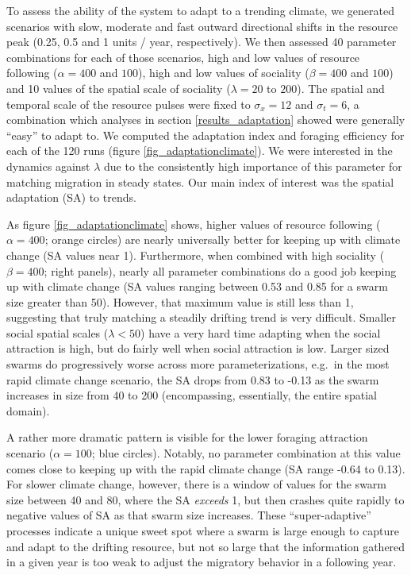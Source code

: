 \documentclass[utf8]{frontiersSCNS} %
\begin{document}
	To assess the ability of the system to adapt to a trending climate, we generated scenarios with slow, moderate and fast outward directional shifts in the resource peak (0.25, 0.5 and 1 units / year, respectively). We then assessed 40 parameter combinations for each of those scenarios, high and low values of resource following ($\alpha = 400$ and $100$), high and low values of sociality ($\beta = 400$ and $100$) and 10 values of the spatial scale of sociality ($\lambda = 20$ to $200$). The spatial and temporal scale of the resource pulses were fixed to $\sigma_x = 12$ and $\sigma_t = 6$, a combination which analyses in section \ref{results_adaptation} showed were generally ``easy'' to adapt to. We computed the adaptation index and foraging efficiency for each of the 120 runs (figure \ref{fig_adaptationclimate}). We were interested in the dynamics against $\lambda$ due to the consistently high importance of this parameter for matching migration in steady states. Our main index of interest was the spatial adaptation (SA) to trends. 
	
	As figure \ref{fig_adaptationclimate} shows, higher values of resource following ($\alpha = 400$; orange circles) are nearly universally better for keeping up with climate change (SA values near 1). Furthermore, when combined with high sociality ($\beta = 400$; right panels), nearly all parameter combinations do a good job keeping up with climate change (SA values ranging between 0.53 and 0.85 for a swarm size greater than 50). However, that maximum value is still less than 1, suggesting that truly matching a steadily drifting trend is very difficult. Smaller social spatial scales ($\lambda < 50$) have a very hard time adapting when the social attraction is high, but do fairly well when social attraction is low. Larger sized swarms do progressively worse across more parameterizations, e.g.~in the most rapid climate change scenario, the SA drops from 0.83 to -0.13 as the swarm increases in size from 40 to 200 (encompassing, essentially, the entire spatial domain).
	
	A rather more dramatic pattern is visible for the lower foraging attraction scenario ($\alpha = 100$; blue circles). Notably, no parameter combination at this value comes close to keeping up with the rapid climate change (SA range -0.64 to 0.13). For slower climate change, however, there is a window of values for the swarm size between 40 and 80, where the SA \emph{exceeds} 1, but then crashes quite rapidly to negative values of SA as that swarm size increases. These ``super-adaptive'' processes indicate a unique sweet spot where a swarm is large enough to capture and adapt to the drifting resource, but not so large that the information gathered in a given year is too weak to adjust the migratory behavior in a following year.
	
\end{document}
